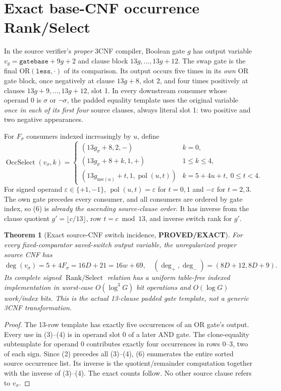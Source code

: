 \documentclass[11pt]{article}
\newtheorem{theorem}{Theorem}
\begin{document}
\section{Exact base-CNF occurrence Rank/Select}
In the source verifier's \emph{proper} 3CNF compiler,
Boolean gate $g$ has output variable
$v_g=\texttt{gatebase}+9g+2$ and clause block
$13g,\ldots,13g+12$. The swap gate is the final
$\mathrm{OR}(\texttt{less},\cdot)$ of its comparison.
Its output occurs five times in its \emph{own} OR gate
block, once negatively at clause $13g+8$, slot 2,
and four times positively at clauses $13g+9,\ldots,13g+12$,
slot 1. In every downstream consumer whose operand 0 is
$\sigma$ or $\neg\sigma$, the padded equality template uses
the original variable \emph{once in each of its first four}
source clauses, always literal slot 1: two positive and two
negative appearances.

For $F_\sigma$ consumers indexed increasingly by $u$, define
\[
\operatorname{OccSelect}(v_\sigma,k)=
\begin{cases}
(13g_\sigma+8,2,-)&k=0,\\
(13g_\sigma+8+k,1,+)&1\le k\le4,\\
(13g_{\mathrm{use}(u)}+t,1,\operatorname{pol}(u,t))
 &k=5+4u+t,\ 0\le t<4 .
\end{cases}                                                \tag{6}
\]
For signed operand $\varepsilon\in\{+1,-1\}$,
$\operatorname{pol}(u,t)=\varepsilon$ for $t=0,1$
and $-\varepsilon$ for $t=2,3$.
The own gate precedes every consumer, and all consumers are ordered by
gate index, so (6) is \emph{already the ascending source-clause order}.
It has inverse from the clause quotient $g'=\lfloor c/13\rfloor$,
row $t=c\bmod13$, and inverse switch rank for $g'$.

\begin{theorem}[Exact source-CNF switch incidence,
\textbf{PROVED/EXACT}]\label{th:cnf}
For every fixed-comparator saved-switch output variable,
the unregularized proper source CNF has
\[
\boxed{\deg(v_\sigma)=5+4F_\sigma=16D+21=16w+69,}
\quad
\boxed{(\deg_+,\deg_-)=(8D+12,8D+9).}                    \tag{7}
\]
Its complete signed $\operatorname{Rank/Select}$ relation has a
uniform table-free indexed implementation in worst-case
$O(\log^3G)$ bit operations and $O(\log G)$ work/index bits.
This is the \emph{actual 13-clause padded gate template},
not a generic 3CNF transformation.
\end{theorem}
\begin{proof}
The 13-row template has exactly five occurrences of an
OR gate's output. Every use in (3)--(4) is in operand slot 0 of
a later AND gate. The clone-equality subtemplate for operand 0
contributes exactly four occurrences in rows 0--3,
two of each sign. Since (2) precedes all (3)--(4),
(6) enumerates the entire sorted source occurrence list.
Its inverse is the quotient/remainder computation together
with the inverse of (3)--(4). The exact counts follow.
No other source clause refers to $v_\sigma$.
\end{proof}
\end{document}
